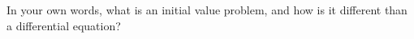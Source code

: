 In your own words, what is an initial value problem, and how is it different than a differential equation?
